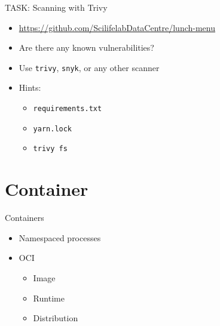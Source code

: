 \documentclass{dcpresentation}
\begin{document}
\begin{frame}{TASK: Scanning with Trivy}
  \begin{itemize}
  \item \url{https://github.com/ScilifelabDataCentre/lunch-menu}
  \item Are there any known vulnerabilities?
  \item Use \texttt{trivy}, \texttt{snyk}, or any other scanner
  \item Hints:
    \begin{itemize}
    \item \texttt{requirements.txt}
    \item \texttt{yarn.lock}
    \item \texttt{trivy fs}
    \end{itemize}
  \end{itemize}
\end{frame}

\section{Container}

\begin{frame}
\end{frame}

\begin{frame}{Containers}
  \begin{itemize}
  \item Namespaced processes
  \item OCI
    \begin{itemize}
    \item Image
    \item Runtime
    \item Distribution
    \end{itemize}
  \end{itemize}
\end{frame}



\begin{frame}
\end{frame}

\end{document}
